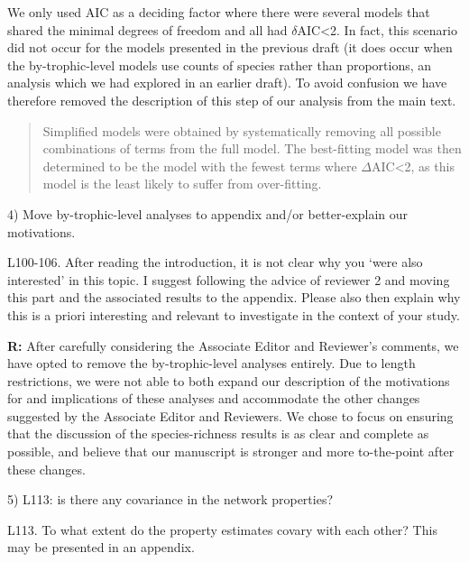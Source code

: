 \documentclass[12pt]{letter}
\newenvironment{refquote}{\bigskip \begin{it}}{\end{it}\smallskip}
\begin{document}
  We only used AIC as a deciding factor where
  there were several models that shared the minimal degrees 
  of freedom and all had $\delta$AIC\textless2. In fact, 
  this scenario did not occur for the models presented in 
  the previous draft (it does occur when the 
  by-trophic-level models use counts of species rather than
  proportions, an analysis which we had explored in an 
  earlier draft). To avoid confusion we have therefore 
  removed the description of this step of our analysis from 
  the main text. 


  \begin{quotation}

    Simplified models were obtained by systematically 
    removing all possible combinations of terms from the 
    full model. The best-fitting model was then determined 
    to be the model with the fewest terms where 
    $\Delta$AIC\textless2, as this model is the least likely 
    to suffer from over-fitting. 

  \end{quotation}


  4) Move by-trophic-level analyses to appendix and/or better-explain our motivations.

  \begin{refquote}

    L100-106. After reading the introduction, it is not clear why you ‘were
    also interested’ in this topic. I suggest following the advice of reviewer
    2 and moving this part and the associated results to the appendix. Please
    also then explain why this is a priori interesting and relevant to
    investigate in the context of your study.

  \end{refquote}

  \textbf{R:} After carefully considering the Associate 
  Editor and Reviewer's comments, we have opted to remove
  the by-trophic-level analyses entirely. Due to length
  restrictions, we were not able to both expand our 
  description of the motivations for and implications of
  these analyses and accommodate the other changes suggested
  by the Associate Editor and Reviewers. We chose to focus
  on ensuring that the discussion of the species-richness
  results is as clear and complete as possible, and believe
  that our manuscript is stronger and more to-the-point
  after these changes. 


  5) L113: is there any covariance in the network properties?

  \begin{refquote}

    L113. To what extent do the property estimates covary with each other?
    This may be presented in an appendix.

  \end{refquote}
\end{document}
